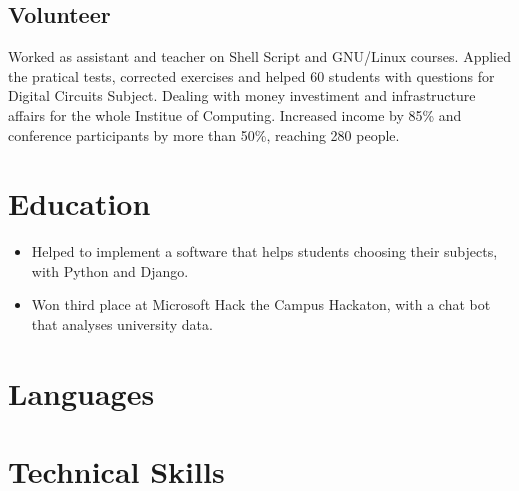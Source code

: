 \documentclass[10pt, a4paper, roman]{moderncv} %
\begin{document}
\subsection{Volunteer}
{
    Worked as assistant and teacher on Shell Script and GNU/Linux courses.
}
{
    Applied the pratical tests, corrected exercises and helped 60 students with questions for Digital Circuits Subject.
}
{ 
    Dealing with money investiment and infrastructure affairs for the whole Institue of Computing.
}
{
    Increased income by 85\% and conference participants by more than 50\%, reaching 280 people.
}
{
}
\section{Education}

{
    \begin{itemize}
        \item Helped to implement a software that helps students choosing their subjects, with Python and Django.
        \item Won third place at Microsoft Hack the Campus Hackaton, with a chat bot that analyses university data.
    \end{itemize} 
}

\section{Languages}


\section{Technical Skills}

\end{document}
